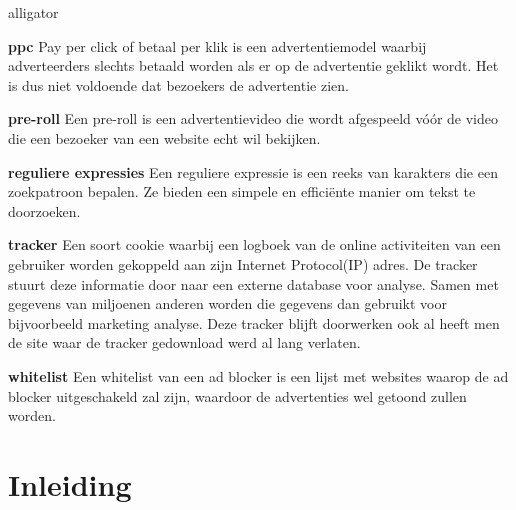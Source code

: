 \documentclass[pdftex,a4paper,12pt,twoside]{report}
\begin{document}
\begin{labeling}{alligator}
\item [\textbf{ppc}] Pay per click of betaal per klik is een advertentiemodel waarbij adverteerders slechts betaald worden als er op de advertentie geklikt wordt. Het is dus niet voldoende dat bezoekers de advertentie zien.

\item [\textbf{pre-roll}] Een pre-roll is een advertentievideo die wordt afgespeeld vóór de video die een bezoeker van een website echt wil bekijken.


\item [\textbf{reguliere expressies}] Een reguliere expressie is een reeks van karakters die een zoekpatroon bepalen. Ze bieden een simpele en efficiënte manier om tekst te doorzoeken.

\item [\textbf{tracker}] Een soort cookie waarbij een logboek van de online activiteiten van een gebruiker worden gekoppeld aan zijn Internet Protocol(IP) adres. De tracker stuurt deze informatie door naar een externe database voor analyse. Samen met gegevens van miljoenen anderen worden die gegevens dan gebruikt voor bijvoorbeeld marketing analyse. Deze tracker blijft doorwerken ook al heeft men de site waar de tracker gedownload werd  al lang verlaten.

\item [\textbf{whitelist}] Een whitelist van een ad blocker is een lijst met websites waarop de ad blocker uitgeschakeld zal zijn, waardoor de advertenties wel getoond zullen worden.











\end{labeling}


\chapter{Inleiding}
\label{ch:inleiding}
\end{document}

